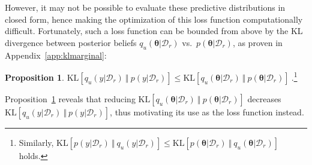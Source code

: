 \documentclass{article}
\theoremstyle{definition}
\newtheorem{proposition}{Proposition}
\newtheorem{remark}{Remark}
\newcommand{\mbf}[1]{\mathbf{#1}}
\newcommand{\mcl}[1]{\mathcal{#1}}
\newcommand{\mbb}[1]{\mathbb{#1}}
\newcommand{\dc}{\mcl{D}_r}
\begin{document}
%
However, it may not be possible to evaluate these predictive distributions in closed form,
hence making the optimization of this loss function computationally difficult.
Fortunately, such a loss function can be bounded from above by the KL divergence between posterior beliefs $q_u(\bm{\theta}|\dc)$ vs.~$p(\bm{\theta}|\dc)$, as proven in Appendix~\ref{app:klmarginal}:\vspace{1mm}
%
\begin{proposition}
\label{rmk:klmarginal}
%
$\text{KL}[q_u(y|\dc)\ \Vert\ p(y|\dc)] \le \text{KL}[q_u(\bm{\theta}|\dc)\ \Vert\ p(\bm{\theta}|\dc)]\ .$\footnote{Similarly, $\text{KL}[p(y|\dc)\ \Vert\ q_u(y|\dc)] \le \text{KL}[p(\bm{\theta}|\dc)\ \Vert\ q_u(\bm{\theta}|\dc)]$  holds.}
%
\end{proposition}
Proposition~\ref{rmk:klmarginal} reveals that reducing $\text{KL}[q_u(\bm{\theta}|\dc)\ \Vert\ p(\bm{\theta}|\dc)]$ decreases $\text{KL}[q_u(y|\dc)\ \Vert\ p(y|\dc)]$, thus motivating its use as the loss function instead. 
% 
\end{document}
